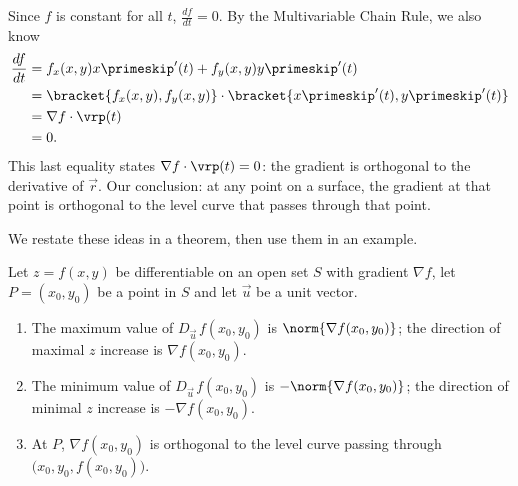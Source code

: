 Since $f$ is constant for all $t$, $\frac{df}{dt} = 0$. By the Multivariable Chain Rule, we also know
\begin{align*}
\frac{df}{dt} &= f_x(x,y)x\primeskip'(t) + f_y(x,y)y\primeskip'(t)\\
	&=\bracket{f_x(x,y),f_y(x,y)}\cdot\bracket{x\primeskip'(t),y\primeskip'(t)}\\
						&= \nabla f \cdot \vrp(t)\\
						&=0.
\end{align*}
This last equality states $\nabla f \cdot \vrp(t) = 0$: the gradient is orthogonal to the derivative of $\vec r$. Our conclusion: at any point on a surface, the gradient at that point is orthogonal to the level curve that passes through that point.

We restate these ideas in a theorem, then use them in an example.

{Let $z=f(x,y)$ be differentiable on an open set $S$ with gradient $\nabla f$, let $P=(x_0,y_0)$ be a point in $S$ and let $\vec u$ be a unit vector.
\begin{enumerate}
	\item The maximum value of $D_{\vec u\,}f(x_0,y_0)$ is $\norm{\nabla f(x_0,y_0)}$; the direction of maximal $z$ increase is $\nabla f(x_0,y_0)$.
	\item   The minimum value of $D_{\vec u\,}f(x_0,y_0)$ is $-\norm{\nabla f(x_0,y_0)}$; the direction of minimal $z$ increase is $-\nabla f(x_0,y_0)$.
	\item At $P$, $\nabla f(x_0,y_0)$ is orthogonal to the level curve passing through $\big(x_0,y_0,f(x_0,y_0)\big)$.
\end{enumerate}}

